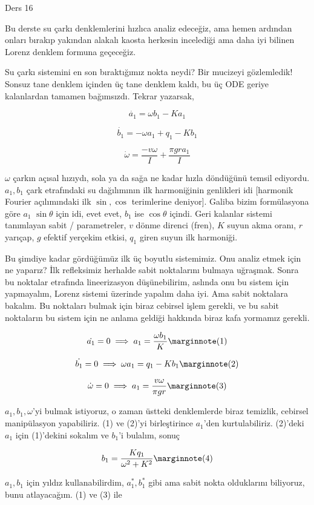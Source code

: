 \documentclass[12pt,fleqn]{article}\usepackage{../../common}
\begin{document}
Ders 16

Bu derste su çarkı denklemlerini hızlıca analiz edeceğiz, ama hemen
ardından onları bırakıp yakından alakalı kaosta herkesin incelediği ama
daha iyi bilinen Lorenz denklem formuna geçeceğiz.

Su çarkı sistemini en son bıraktığımız nokta neydi? Bir mucizeyi
gözlemledik! Sonsuz tane denklem içinden üç tane denklem kaldı, bu üç ODE
geriye kalanlardan tamamen bağımsızdı. Tekrar yazarsak,

$$ \dot{a_1} = \omega b_1 - K a_1 $$

$$ \dot{b_1} = -\omega a_1 + q_1 - Kb_1 $$

$$ \dot{\omega} = \frac{-v\omega}{I} + \frac{\pi gr a_1}{I} $$

$\omega$ çarkın açısal hızıydı, sola ya da sağa ne kadar hızla döndüğünü
temsil ediyordu. $a_1,b_1$ çark etrafındaki su dağılımının ilk harmoniğinin
genlikleri idi [harmonik Fourier açılımındaki ilk $\sin,\cos$ terimlerine
deniyor]. Galiba bizim formülasyona göre $a_1$ $\sin\theta$ için idi, evet
evet, $b_1$ ise $\cos\theta$ içindi. Geri kalanlar sistemi tanımlayan sabit
/ parametreler, $v$ dönme direnci (fren), $K$ suyun akma oranı, $r$
yarıçap, $g$ efektif yerçekim etkisi, $q_1$ giren suyun ilk harmoniği. 

Bu şimdiye kadar gördüğümüz ilk üç boyutlu sistemimiz. Onu analiz etmek
için ne yaparız? İlk refleksimiz herhalde sabit noktalarını bulmaya
uğraşmak. Sonra bu noktalar etrafında lineerizasyon düşünebilirim, aslında
onu bu sistem için yapmayalım, Lorenz sistemi üzerinde yapalım daha
iyi. Ama sabit noktalara bakalım. Bu noktaları bulmak için biraz cebirsel
işlem gerekli, ve bu sabit noktaların bu sistem için ne anlama geldiği
hakkında biraz kafa yormamız gerekli.

$$ 
\dot{a_1} = 0 \implies a_1 = \frac{\omega b_1}{K}  
\mlabel{1} 
$$

$$ 
\dot{b_1} = 0 \implies \omega a_1 = q_1 - K b_1 
\mlabel{2} 
$$

$$ 
\dot{\omega} = 0 \implies a_1 = \frac{v \omega}{\pi gr} 
\mlabel{3}
$$

$a_1,b_1,\omega$'yi bulmak istiyoruz, o zaman üstteki denklemlerde biraz
temizlik, cebirsel manipülasyon yapabiliriz. (1) ve (2)'yi birleştirince
$a_1$'den kurtulabiliriz. (2)'deki $a_1$ için (1)'dekini sokalım ve $b_1$'i
bulalım, sonuç

$$ 
b_1 = \frac{K q_1}{\omega^2 + K^2}  
\mlabel{4} 
$$

$a_1,b_1$ için yıldız kullanabilirdim, $a_1^*,b_1^*$ gibi ama sabit nokta
olduklarını biliyoruz, bunu atlayacağım. (1) ve (3) ile
\end{document}
